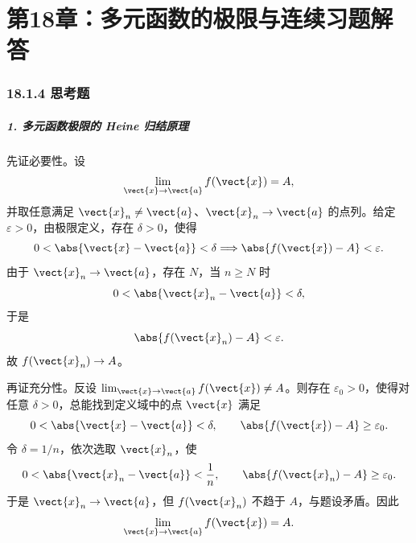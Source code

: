 
\chapter*{第18章：多元函数的极限与连续习题解答}
\subsection*{18.1.4 思考题}

\paragraph{1. 多元函数极限的 Heine 归结原理}
\begin{xsolution}
先证必要性。设
\[
  \lim_{\vect{x}\to\vect{a}}f(\vect{x})=A,
\]
并取任意满足 $\vect{x}_n\ne\vect{a}$、$\vect{x}_n\to\vect{a}$ 的点列。给定 $\varepsilon>0$，由极限定义，存在 $\delta>0$，使得
\[
  0<\abs{\vect{x}-\vect{a}}<\delta
  \Longrightarrow
  \abs{f(\vect{x})-A}<\varepsilon.
\]
由于 $\vect{x}_n\to\vect{a}$，存在 $N$，当 $n\ge N$ 时
\[
  0<\abs{\vect{x}_n-\vect{a}}<\delta,
\]
于是
\[
  \abs{f(\vect{x}_n)-A}<\varepsilon.
\]
故 $f(\vect{x}_n)\to A$。

再证充分性。反设 $\lim_{\vect{x}\to\vect{a}}f(\vect{x})\ne A$。则存在 $\varepsilon_0>0$，使得对任意 $\delta>0$，总能找到定义域中的点 $\vect{x}$ 满足
\[
  0<\abs{\vect{x}-\vect{a}}<\delta,
  \qquad
  \abs{f(\vect{x})-A}\ge\varepsilon_0.
\]
令 $\delta=1/n$，依次选取 $\vect{x}_n$，使
\[
  0<\abs{\vect{x}_n-\vect{a}}<\frac1n,
  \qquad
  \abs{f(\vect{x}_n)-A}\ge\varepsilon_0.
\]
于是 $\vect{x}_n\to\vect{a}$，但 $f(\vect{x}_n)$ 不趋于 $A$，与题设矛盾。因此
\[
  \lim_{\vect{x}\to\vect{a}}f(\vect{x})=A.
\]
\end{xsolution}

